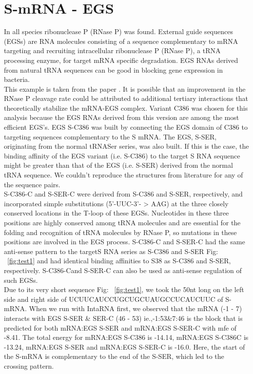 \documentclass[twoside,a4paper]{report}
\numberwithin{equation}{section}
\begin{document}
\clearpage
	\section{S-mRNA - EGS }
	
	 In all species ribonuclease P (RNase P) was found. External guide sequences (EGSs) are RNA molecules consisting of a sequence complementary to mRNA targeting and recruiting intracellular ribonuclease P (RNase P), a tRNA processing enzyme, for target mRNA specific degradation. EGS  RNAs  derived  from  natural  tRNA sequences can be good in blocking gene expression in  bacteria.\\
	 
	 This example is taken from the paper {\citep{zhang2013engineered}}. It is possible that an improvement in the RNase P cleavage rate could be attributed to additional tertiary interactions that theoretically stabilize the mRNA-EGS complex. Variant C386 was chosen for this analysis because the EGS RNAs derived from this version are among the most efficient EGS's. EGS S-C386 was built by connecting the EGS domain of C386 to targeting sequences complementary to the S mRNA. The EGS, S-SER, originating from the normal tRNASer series, was also built. If this is the case, the binding affinity of the EGS variant (i.e. S-C386) to the target S RNA sequence might be greater than that of the EGS (i.e. S-SER) derived from the normal tRNA sequence. We couldn't reproduce the structures from literature for any of the sequence pairs.\\
	 
	 S-C386-C and S-SER-C were derived from S-C386 and S-SER, respectively, and incorporated simple substitutions (5'-UUC-3'- > AAG) at the three closely conserved locations in the T-loop of these EGSs. Nucleotides in these three positions are highly conserved among tRNA molecules and are essential for the folding and recognition of tRNA molecules by RNase P, so mutations in these positions are involved in the EGS process. S-C386-C and S-SER-C had the same anti-sense pattern to the targetS RNA series as S-C386 and S-SER Fig: ~\ref{fig:test1}  and had identical binding affinities to S38 as S-C386 and S-SER, respectively. S-C386-Cand S-SER-C can also be used as anti-sense regulation of such EGSs.\\
	   
	 
	 Due to its very short sequence Fig: ~\ref{fig:test1}, we took the 50nt long on the left side and right side of UCUUCAUCCUGCUGCUAUGCCUCAUCUUC of S-mRNA. When we run with IntaRNA first, we observed that the mRNA (-1 - 7) interacts with EGS S-SER \& SER-C (46 - 53) ie.,-1:53\&7:46 is the block that is predicted for both mRNA:EGS S-SER and mRNA:EGS S-SER-C with mfe of -8.41. The total energy for mRNA:EGS S-C386 is -14.14, mRNA:EGS S-C386C is -13.24, mRNA:EGS S-SER and mRNA:EGS S-SER-C is -16.0.  Here, the start of the S-mRNA is complementary to the end of the S-SER, which led to the crossing pattern.  \\
	 
\end{document}
